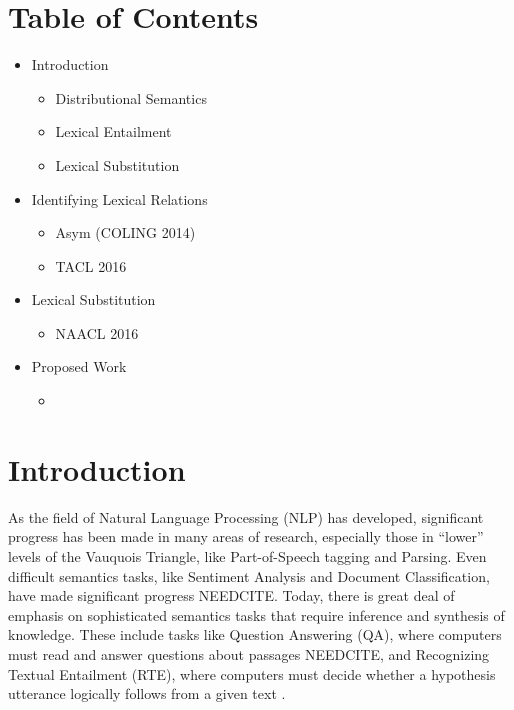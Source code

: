 \documentclass[letterpaper]{article}
\begin{document}
\pagebreak
\section*{Table of Contents}
\begin{itemize}
  \item Introduction
    \begin{itemize}
      \item Distributional Semantics
      \item Lexical Entailment
      \item Lexical Substitution
    \end{itemize}
  \item Identifying Lexical Relations
    \begin{itemize}
      \item Asym (COLING 2014)
      \item TACL 2016
    \end{itemize}
  \item Lexical Substitution
    \begin{itemize}
      \item NAACL 2016
    \end{itemize}
  \item Proposed Work
    \begin{itemize}
      \item 
    \end{itemize}
\end{itemize}
\pagebreak

\section{Introduction}

As the field of Natural Language Processing (NLP) has developed, significant
progress has been made in many areas of research, especially those in ``lower''
levels of the Vauquois Triangle, like Part-of-Speech tagging and Parsing.  Even
difficult semantics tasks, like Sentiment Analysis and Document Classification,
have made significant progress NEEDCITE. Today, there is great deal of emphasis
on sophisticated semantics tasks that require inference and synthesis of
knowledge. These include tasks like Question Answering (QA), where computers
must read and answer questions about passages NEEDCITE, and Recognizing Textual
Entailment (RTE), where computers must decide whether a hypothesis utterance
logically follows from a given text \cite{marelli:2014:semeval}.
\end{document}
